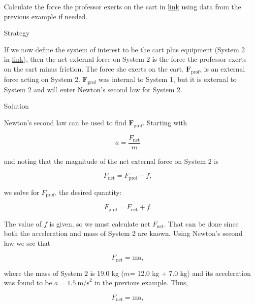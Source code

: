 \documentclass[
]{book}
\newenvironment{tinysection}{}{}
\begin{document}
Calculate the force the professor exerts on the cart in
\protect\hyperlink{import-auto-id2324690}{link} using data from
the previous example if needed.

\begin{tinysection}

{Strategy}

\end{tinysection}

If we now define the system of interest to be the cart plus equipment
(System 2 in \protect\hyperlink{import-auto-id2324690}{link}),
then the net external force on System 2 is the force the professor
exerts on the cart minus friction. The force she exerts on the cart,
\(\textbf{F}_{\text{prof}}{}\), is an external force acting on System 2.
\(\textbf{F}_{\text{prof}}{}\) was internal to System 1, but it is
external to System 2 and will enter Newton's second law for System 2.

\begin{tinysection}

{Solution}

\end{tinysection}

Newton's second law can be used to find \(\textbf{F}_{\text{prof}}{}\).
Starting with

\leavevmode\hypertarget{eip-id1949236}{}%
\[{a = \frac{F_{\text{net}}}{m}}{}\]

and noting that the magnitude of the net external force on System 2 is

\leavevmode\hypertarget{eip-id2390884}{}%
\[{F_{\text{net}} = {F_{\text{prof}} - f}},\]

we solve for \(F_{\text{prof}}{}\), the desired quantity:

\leavevmode\hypertarget{eip-id1373488}{}%
\[{F_{\text{prof}} = {F_{\text{net}} + f.}}{}\]

The value of \(f{}\)\emph{} is given, so we must
calculate net \(F_{\text{net}}{}\). That can be done since both the
acceleration and mass of System 2 are known. Using Newton's second law
we see that

\leavevmode\hypertarget{eip-id2367884}{}%
\[{F_{\text{net}} = \text{ma}},\]

where the mass of System 2 is 19.0 kg
(\(m{}\)\emph{}= 12.0 kg + 7.0 kg) and its
acceleration was found to be \({{a = 1.5\ }\text{m/s}^{2}}{}\) in the
previous example. Thus,

\leavevmode\hypertarget{eip-id3477001}{}%
\[{F_{\text{net}} = \text{ma}},\]
\end{document}
